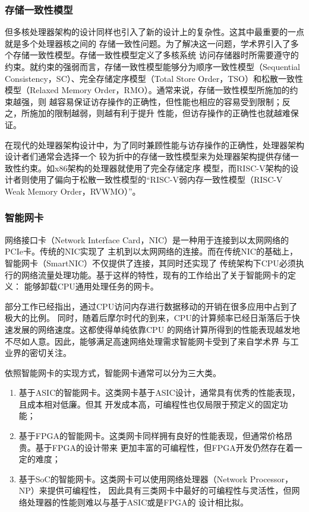 \subsubsection{存储一致性模型}
\label{section:background_consistent_model}

但多核处理器架构的设计同样也引入了新的设计上的复杂性。这其中最重要的一点就是多个处理器核之间的
存储一致性问题。为了解决这一问题，学术界引入了多个存储一致性模型。存储一致性模型定义了多核系统
访问存储器时所需要遵守的约束。就约束的强弱而言，存储一致性模型能够分为顺序一致性模型（Sequential
Consistency，SC）、完全存储定序模型（Total Store Order，TSO）和松散一致性模型（Relaxed
Memory Order，RMO）\cite{sorin2011primer}。通常来说，存储一致性模型所施加的约束越强，则
越容易保证访存操作的正确性，但性能也相应的容易受到限制；反之，所施加的限制越弱，则越有利于提升
性能，但访存操作的正确性也就越难保证。

在现代的处理器架构设计中，为了同时兼顾性能与访存操作的正确性，处理器架构设计者们通常会选择一个
较为折中的存储一致性模型来为处理器架构提供存储一致性约束。如x86架构的处理器就使用了完全存储定序
模型，而RISC-V架构的设计者则使用了偏向于松散一致性模型的“RISC-V弱内存一致性模型（RISC-V Weak
Memory Order，RVWMO）”\cite{waterman2016design,waterman2014risc,waterman2015risc}。

\subsubsection{智能网卡}
\label{section:background_smartnic}

网络接口卡（Network Interface Card，NIC）是一种用于连接到以太网网络的PCIe卡。传统的NIC实现了
主机到以太网网络的连接。而在传统NIC的基础上，智能网卡（SmartNIC）不仅提供了连接，其同时还实现了
传统架构下CPU必须执行的网络流量处理功能。基于这样的特性，现有的工作给出了关于智能网卡的定义：
能够卸载CPU通用处理任务的网卡\cite{pcmag_smartnic,maxiaoxiao2022survey}。

部分工作已经指出，通过CPU访问内存进行数据移动的开销在很多应用中占到了极大的比例\cite{maxiaoxiao2022survey}。
同时，随着后摩尔时代的到来，CPU的计算频率已经日渐落后于快速发展的网络速度。这都使得单纯依靠CPU
的网络计算所得到的性能表现越发地不尽如人意。因此，能够满足高速网络处理需求智能网卡受到了来自学术界
与工业界的密切关注。

依照智能网卡的实现方式，智能网卡通常可以分为三大类\cite{bhalgat2021smartnic}。

\begin{enumerate}
  \item 基于ASIC的智能网卡。这类网卡基于ASIC设计，通常具有优秀的性能表现，且成本相对低廉。但其
        开发成本高，可编程性也仅局限于预定义的固定功能；
  \item 基于FPGA的智能网卡。这类网卡同样拥有良好的性能表现，但通常价格昂贵。基于FPGA的设计带来
        更加丰富的可编程性，但FPGA开发仍然存在着一定的难度；
  \item 基于SoC的智能网卡。这类网卡可以使用网络处理器（Network Processor，NP）来提供可编程性，
        因此具有三类网卡中最好的可编程性与灵活性，但网络处理器的性能则难以与基于ASIC或是FPGA的
        设计相比拟。
\end{enumerate}

